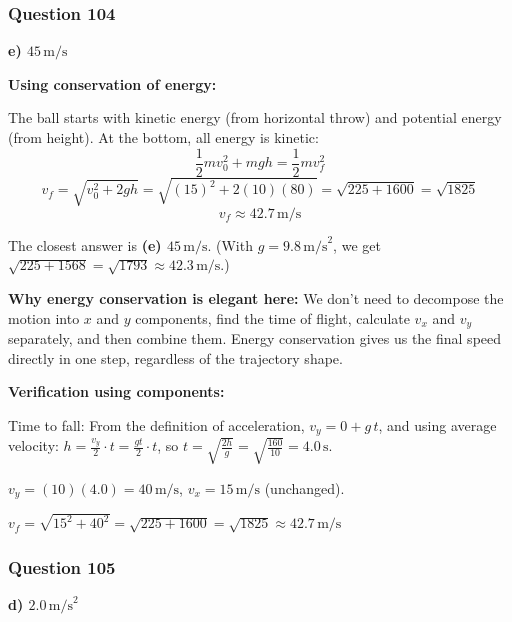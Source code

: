 \documentclass[12pt,letterpaper]{article}
\begin{document}
\subsubsection*{Question 104}

\begin{answerbox}
\textbf{e) $45\,\text{m/s}$}
\end{answerbox}

\begin{explanationbox}
\textbf{Using conservation of energy:}

The ball starts with kinetic energy (from horizontal throw) and potential energy (from height). At the bottom, all energy is kinetic:
\[
\frac{1}{2}mv_0^2 + mgh = \frac{1}{2}mv_f^2
\]
\[
v_f = \sqrt{v_0^2 + 2gh} = \sqrt{(15)^2 + 2(10)(80)} = \sqrt{225 + 1600} = \sqrt{1825}
\]
\[
v_f \approx 42.7\,\text{m/s}
\]

The closest answer is \textbf{(e) $45\,\text{m/s}$}. (With $g = 9.8\,\text{m/s}^2$, we get $\sqrt{225 + 1568} = \sqrt{1793} \approx 42.3\,\text{m/s}$.)

\textbf{Why energy conservation is elegant here:} We don't need to decompose the motion into $x$ and $y$ components, find the time of flight, calculate $v_x$ and $v_y$ separately, and then combine them. Energy conservation gives us the final speed directly in one step, regardless of the trajectory shape.

\textbf{Verification using components:}

Time to fall: From the definition of acceleration, $v_y = 0 + g\,t$, and using average velocity: $h = \frac{v_y}{2}\cdot t = \frac{gt}{2}\cdot t$, so $t = \sqrt{\frac{2h}{g}} = \sqrt{\frac{160}{10}} = 4.0\,\text{s}$.

$v_y = (10)(4.0) = 40\,\text{m/s}$, $v_x = 15\,\text{m/s}$ (unchanged).

$v_f = \sqrt{15^2 + 40^2} = \sqrt{225 + 1600} = \sqrt{1825} \approx 42.7\,\text{m/s}$ \checkmark
\end{explanationbox}

\subsubsection*{Question 105}

\begin{answerbox}
\textbf{d) $2.0\,\text{m/s}^2$}
\end{answerbox}
\end{document}
